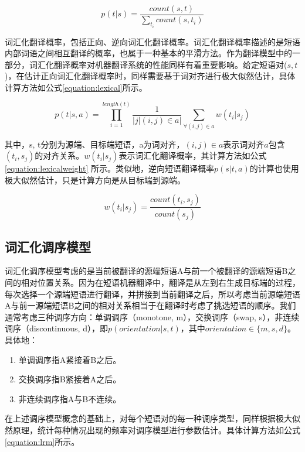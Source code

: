 \documentclass[master, winfont]{njuthesis}
\begin{document}
\begin{equation}\label{equation:tprob}
  p(t|s)=\frac{count(s,t)}{\sum_{t_i}count(s, t_i)}
\end{equation}

词汇化翻译概率，包括正向、逆向词汇化翻译概率。词汇化翻译概率描述的是短语内部词语之间相互翻译的概率，也属于一种基本的平滑方法。作为翻译模型中的一部分，词汇化翻译概率对机器翻译系统的性能同样有着重要影响。给定短语对($s,t$)，在估计正向词汇化翻译概率时，同样需要基于词对齐进行极大似然估计，具体计算方法如公式\ref{equation:lexical}所示。

\begin{equation}
  \label{equation:lexical}
  p(t|s,a)=\prod_{i=1}^{length(t)} \frac{1}{|{j|(i,j) \in a}|} \sum_{\forall (i,j) \in a} w(t_i|s_j)
\end{equation}

其中，s, t分别为源端、目标端短语，a为词对齐，$(i,j) \in a$表示词对齐$a$包含$(t_i, s_j)$的对齐关系。$w(t_i|s_j)$表示词汇化翻译概率，其计算方法如公式\ref{equation:lexicalweight} 所示。类似地，逆向短语翻译概率$p(s|t,a)$的计算也使用极大似然估计，只是计算方向是从目标端到源端。

\begin{equation}
  \label{equation:lexicalweight}
  w(t_i|s_j)=\frac{count(t_i,s_j)}{count(s_j)}
\end{equation}
\subsection{词汇化调序模型}
词汇化调序模型\cite{tillmann2004unigram}考虑的是当前被翻译的源端短语A与前一个被翻译的源端短语B之间的相对位置关系。因为在短语机器翻译中，翻译是从左到右生成目标端的过程，每次选择一个源端短语进行翻译，并拼接到当前翻译之后，所以考虑当前源端短语A与前一源端短语B之间的相对关系相当于在翻译时考虑了挑选短语的顺序。我们通常考虑三种调序方向：单调调序（monotone, m），交换调序（swap, s），非连续调序（discontinuous, d），即$ p(orientation|s, t)$，其中$orientation \in \{m, s, d\}$。 具体地：
\begin{enumerate}
  \item 单调调序指A紧接着B之后。
  \item 交换调序指B紧接着A之后。
  \item 非连续调序指A与B不连续。
\end{enumerate}

在上述调序模型概念的基础上，对每个短语对的每一种调序类型，同样根据极大似然原理，统计每种情况出现的频率对调序模型进行参数估计。具体计算方法如公式\ref{equation:lrm}所示。
\end{document}
